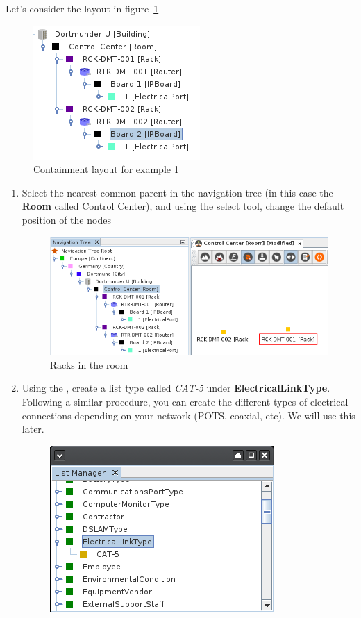 \documentclass[a4paper]{article}
\begin{document}
			Let's consider the layout in figure~\ref{fig:l1_example_1_layout}
			\begin{figure}[h!]
				\centering
				\includegraphics[width=0.3\linewidth]{img/l1_example_1_layout.png}
				\caption{Containment layout for example 1}
				\label{fig:l1_example_1_layout}
			\end{figure}
			\begin{enumerate}
				\item Select the nearest common parent in the navigation tree (in this case the \textbf{Room} called Control Center), and using the select tool, change the default position of the nodes
				\begin{figure}[h!]
					\centering
					\includegraphics[width=0.8\linewidth]{img/l1_example_1_initial_view.png}
					\caption{Racks in the room}
					\label{fig:l1_example_1_initial_view}
				\end{figure}
				\item Using the \textbf{}, create a list type called \textit{CAT-5} under \textbf{ElectricalLinkType}. Following a similar procedure, you can create the different types of electrical connections depending on your network (POTS, coaxial, etc). We will use this later.
				\label{item:connection_type}
				\newpage
				\begin{figure}[h!]
					\centering
					\includegraphics[width=0.4\linewidth]{img/l1_example_1_electrical_link_type.png}

\end{figure}
\end{enumerate}
\end{document}

